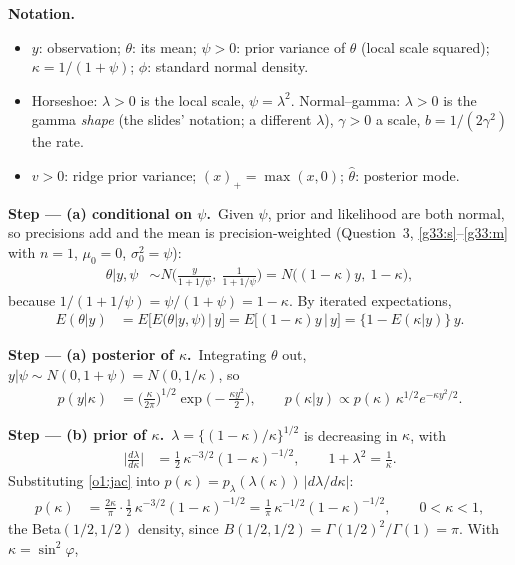 \documentclass[11pt,a4paper]{article}
\newenvironment{notacao}{\par\smallskip\noindent\textbf{Notation.}\begin{itemize}[leftmargin=1.4em,topsep=1pt,itemsep=0pt]\small}{\end{itemize}}
\newcommand{\passo}[2]{\par\smallskip\noindent\textbf{Step --- #1.}~#2}
\begin{document}
\begin{sol}
\begin{notacao}
\item $y$: observation; $\theta$: its mean; $\psi>0$: prior variance of $\theta$ (local scale squared); $\kappa=1/(1+\psi)$; $\phi$: standard normal density.
\item Horseshoe: $\lambda>0$ is the local scale, $\psi=\lambda^2$. Normal--gamma: $\lambda>0$ is the gamma \emph{shape} (the slides' notation; a different $\lambda$), $\gamma>0$ a scale, $b=1/(2\gamma^2)$ the rate.
\item $v>0$: ridge prior variance; $(x)_+=\max(x,0)$; $\hat\theta$: posterior mode.
\end{notacao}
\passo{(a) conditional on $\psi$}{Given $\psi$, prior and likelihood are both normal, so precisions add and the mean is precision-weighted (Question~3, \eqref{g33:s}--\eqref{g33:m} with $n=1$, $\mu_0=0$, $\sigma_0^2=\psi$):
\begin{align}
\theta|y,\psi&\sim N\Big(\frac{y}{1+1/\psi},\ \frac{1}{1+1/\psi}\Big)=N\big((1-\kappa)y,\ 1-\kappa\big),\label{o1:cond}
\end{align}
because $1/(1+1/\psi)=\psi/(1+\psi)=1-\kappa$. By iterated expectations,
\begin{align}
E(\theta|y)&=E\big[E(\theta|y,\psi)\,\big|\,y\big]=E\big[(1-\kappa)y\,|\,y\big]=\{1-E(\kappa|y)\}\,y.\label{o1:tower}
\end{align}}
\passo{(a) posterior of $\kappa$}{Integrating $\theta$ out, $y|\psi\sim N(0,1+\psi)=N(0,1/\kappa)$, so
\begin{align}
p(y|\kappa)&=\Big(\frac{\kappa}{2\pi}\Big)^{1/2}\exp\Big(-\frac{\kappa y^2}{2}\Big),\qquad
p(\kappa|y)\propto p(\kappa)\,\kappa^{1/2}e^{-\kappa y^2/2}.\label{o1:pk}
\end{align}}
\passo{(b) prior of $\kappa$}{$\lambda=\{(1-\kappa)/\kappa\}^{1/2}$ is decreasing in $\kappa$, with
\begin{align}
\Big|\frac{d\lambda}{d\kappa}\Big|&=\frac12\,\kappa^{-3/2}(1-\kappa)^{-1/2},\qquad1+\lambda^2=\frac1\kappa.\label{o1:jac}
\end{align}
Substituting \eqref{o1:jac} into $p(\kappa)=p_\lambda(\lambda(\kappa))\,|d\lambda/d\kappa|$:
\begin{align}
p(\kappa)&=\frac{2\kappa}{\pi}\cdot\frac12\,\kappa^{-3/2}(1-\kappa)^{-1/2}=\frac{1}{\pi}\,\kappa^{-1/2}(1-\kappa)^{-1/2},\qquad0<\kappa<1,\label{o1:beta}
\end{align}
the Beta$(1/2,1/2)$ density, since $B(1/2,1/2)=\Gamma(1/2)^2/\Gamma(1)=\pi$. With $\kappa=\sin^2\varphi$,
}
\end{sol}
\end{document}
